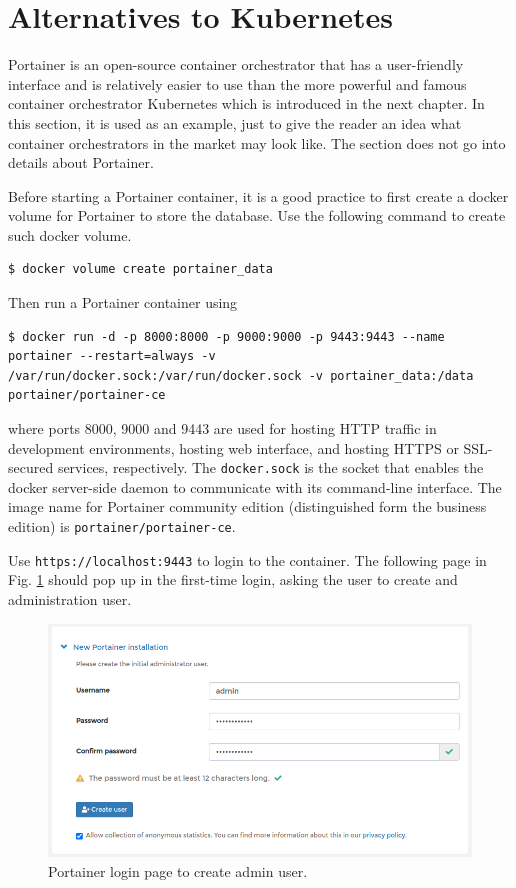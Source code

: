 \section{Alternatives to Kubernetes}

Portainer is an open-source container orchestrator that has a user-friendly interface and is relatively easier to use than the more powerful and famous container orchestrator Kubernetes which is introduced in the next chapter. In this section, it is used as an example, just to give the reader an idea what container orchestrators in the market may look like. The section does not go into details about Portainer.

Before starting a Portainer container, it is a good practice to first create a docker volume for Portainer to store the database. Use the following command to create such docker volume.
\begin{lstlisting}
$ docker volume create portainer_data
\end{lstlisting}
Then run a Portainer container using
\begin{lstlisting}
$ docker run -d -p 8000:8000 -p 9000:9000 -p 9443:9443 --name portainer --restart=always -v /var/run/docker.sock:/var/run/docker.sock -v portainer_data:/data portainer/portainer-ce
\end{lstlisting}
where ports 8000, 9000 and 9443 are used for hosting HTTP traffic in development environments, hosting web interface, and hosting HTTPS or SSL-secured services, respectively. The \verb|docker.sock| is the socket that enables the docker server-side daemon to communicate with its command-line interface. The image name for Portainer community edition (distinguished form the business edition) is \verb|portainer/portainer-ce|.

Use \verb|https://localhost:9443| to login to the container. The following page in Fig. \ref{ch:vac:fig:portainerlogin} should pop up in the first-time login, asking the user to create and administration user.
\begin{figure}[htbp]
	\centering
	\includegraphics[width=350pt]{chapters/part-3/figures/portainerlogin.png}
	\caption{Portainer login page to create admin user.} \label{ch:vac:fig:portainerlogin}
\end{figure}


